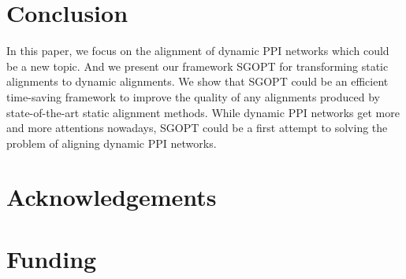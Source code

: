 \documentclass{bioinfo}
\theoremstyle{definition}
\begin{document}
\section{Conclusion}
In this paper, we focus on the alignment of dynamic PPI networks which could be a new topic. And we present our framework SGOPT for transforming static alignments to dynamic alignments. We show that SGOPT could be an efficient time-saving framework to improve the quality of any alignments produced by state-of-the-art static alignment methods. While dynamic PPI networks get more and more attentions nowadays, SGOPT could be a first attempt to solving the problem of aligning dynamic PPI networks.



\section*{Acknowledgements}
\section*{Funding}



\end{document}
